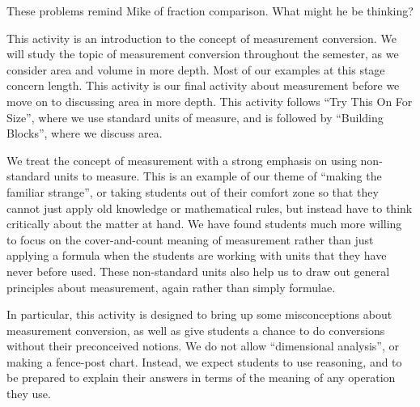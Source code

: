 \documentclass[nooutcomes]{ximera}
\begin{document}
\begin{problem} \label{BackAndForth3}
These problems remind Mike of fraction comparison.  What might he be thinking?


\end{problem}

\newpage
\begin{instructorNotes}
This activity is an introduction to the concept of measurement conversion.  We will study the topic of measurement conversion throughout the semester, as we consider area and volume in more depth.  Most of our examples at this stage concern length.  This activity is our final activity about measurement before we move on to discussing area in more depth.  This activity follows ``Try This On For Size'', where we use standard units of measure, and is followed by ``Building Blocks'', where we discuss area.

We treat the concept of measurement with a strong emphasis on using non-standard units to measure.  This is an example of our theme of ``making the familiar strange'', or taking students out of their comfort zone so that they cannot just apply old knowledge or mathematical rules, but instead have to think critically about the matter at hand.  We have found students much more willing to focus on the cover-and-count meaning of measurement rather than just applying a formula when the students are working with units that they have never before used.  These non-standard units also help us to draw out general principles about measurement, again rather than simply formulae.

In particular, this activity is designed to bring up some misconceptions about measurement conversion, as well as give students a chance to do conversions without their preconceived notions.  We do not allow ``dimensional analysis'', or making a fence-post chart.  Instead, we expect students to use reasoning, and to be prepared to explain their answers in terms of the meaning of any operation they use.


\end{instructorNotes}
\end{document}
